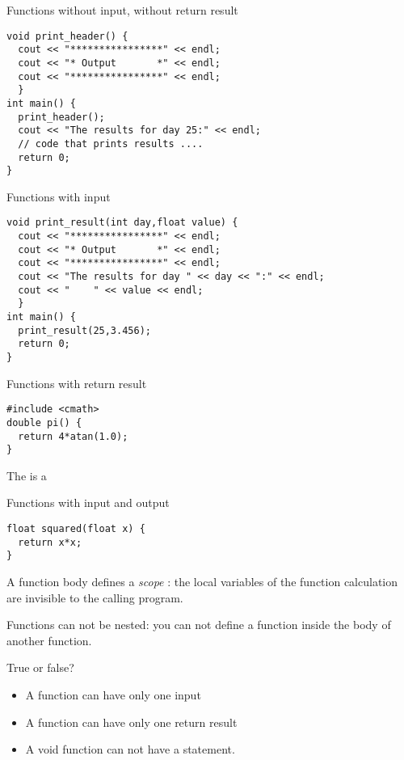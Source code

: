 \begin{block}{Functions without input, without return result}
  \label{sl:func-ex1}
\begin{verbatim}
void print_header() {
  cout << "****************" << endl;
  cout << "* Output       *" << endl;
  cout << "****************" << endl;
  }
int main() {
  print_header();
  cout << "The results for day 25:" << endl;
  // code that prints results ....
  return 0;
}
\end{verbatim}
\end{block}

\begin{block}{Functions with input}
  \label{sl:func-ex2}
\begin{verbatim}
void print_result(int day,float value) {
  cout << "****************" << endl;
  cout << "* Output       *" << endl;
  cout << "****************" << endl;
  cout << "The results for day " << day << ":" << endl;
  cout << "    " << value << endl;
  }
int main() {
  print_result(25,3.456);
  return 0;
}
\end{verbatim}
\end{block}

\begin{block}{Functions with return result}
  \label{sl:func-return}
\begin{verbatim}
#include <cmath>
double pi() {
  return 4*atan(1.0);
}
\end{verbatim}
The  is a 
\end{block}

\begin{block}{Functions with input and output}
  \label{sl:func-param-return}
\begin{verbatim}
float squared(float x) {
  return x*x;
}
\end{verbatim}
\end{block}

A function body defines a
%
\emph{scope}%
:
the local variables of the function calculation are invisible to the
calling program.

Functions can not be nested: you can not define a function inside the
body of another function.

\begin{review}
  \label{rev:func-param}
  True or false?
  \begin{itemize}
  \item A function can have only one input
  \item A function can have only one return result
  \item A void function can not have a  statement.
  \end{itemize}
\end{review}


